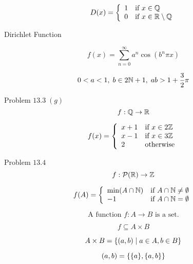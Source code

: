 \begin{frame}{}
  \[
    D(x) = \left\{\begin{array}{ll}
      1 & \text{if } x \in \mathbb{Q} \\
      0 & \text{if } x \in \mathbb{R} \setminus \mathbb{Q} 
    \end{array}\right.
  \]

  \vspace{0.60cm}
  \centerline{Dirichlet Function}
\end{frame}

\begin{frame}{}

  \[
    f(x)=\sum_{n=0} ^\infty a^n \cos(b^n \pi x) 
  \]

  \[
    0 < a < 1,\; b \in 2\mathbb{N} + 1,\; ab > 1+\frac{3}{2} \pi
  \]
\end{frame}

\begin{frame}{}
  \begin{exampleblock}{Problem $13.3\; (g)$}
    \[
      f: \mathbb{Q} \to \mathbb{R}{}
    \]

    \[
      f(x) = \left\{\begin{array}{ll}
	x + 1 & \text{if } x \in 2\mathbb{Z}{} \\
	x - 1 & \text{if } x \in 3\mathbb{Z}{} \\
	2     & \text{otherwise}
      \end{array}\right.
    \]
  \end{exampleblock}
\end{frame}

\begin{frame}{}
  \begin{exampleblock}{Problem $13.4$}
    \[
      f: \mathcal{P}(\mathbb{R}{}) \to \mathbb{Z}{}
    \]

    \[
      f(A) = \left\{\begin{array}{ll}
	\min(A \cap \mathbb{N}{}) & \text{if } A \cap \mathbb{N}{} \neq \emptyset \\
	-1 & \text{if } A \cap \mathbb{N}{} = \emptyset
      \end{array}\right.
    \]
  \end{exampleblock}
\end{frame}

\begin{frame}{}
  \[
    \text{A function } f: A \to B \text{ is a set.}
  \]

  \[
    f \subseteq A \times B
  \]

  \[
    A \times B = \{(a,b) \mid a \in A, b \in B\}
  \]

  \[
    (a,b) = \{\{a\}, \{a,b\}\}
  \]
\end{frame}

